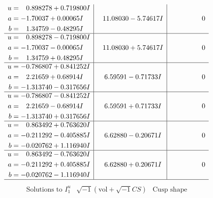 \documentclass[1p]{elsarticle_modified}
\theoremstyle{definition}
\newcommand{\I}{\sqrt{-1}}
\begin{document}
$$\begin{array}{c|c|c}
\begin{aligned}
u &= \phantom{-}0.898278 + 0.719800 I \\
a &= -1.70037 + 0.00065 I \\
b &= \phantom{-}1.34759 - 0.48295 I\end{aligned}
 & \phantom{-}11.08030 - 5.74617 I & \phantom{-0.000000 } 0 \\ \hline\begin{aligned}
u &= \phantom{-}0.898278 - 0.719800 I \\
a &= -1.70037 - 0.00065 I \\
b &= \phantom{-}1.34759 + 0.48295 I\end{aligned}
 & \phantom{-}11.08030 + 5.74617 I & \phantom{-0.000000 } 0 \\ \hline\begin{aligned}
u &= -0.786807 + 0.841252 I \\
a &= \phantom{-}2.21659 + 0.68914 I \\
b &= -1.313740 - 0.317656 I\end{aligned}
 & \phantom{-}6.59591 - 0.71733 I & \phantom{-0.000000 } 0 \\ \hline\begin{aligned}
u &= -0.786807 - 0.841252 I \\
a &= \phantom{-}2.21659 - 0.68914 I \\
b &= -1.313740 + 0.317656 I\end{aligned}
 & \phantom{-}6.59591 + 0.71733 I & \phantom{-0.000000 } 0 \\ \hline\begin{aligned}
u &= \phantom{-}0.863492 + 0.763620 I \\
a &= -0.211292 - 0.405885 I \\
b &= -0.020762 + 1.116940 I\end{aligned}
 & \phantom{-}6.62880 - 0.20671 I & \phantom{-0.000000 } 0 \\ \hline\begin{aligned}
u &= \phantom{-}0.863492 - 0.763620 I \\
a &= -0.211292 + 0.405885 I \\
b &= -0.020762 - 1.116940 I\end{aligned}
 & \phantom{-}6.62880 + 0.20671 I & \phantom{-0.000000 } 0\\
 \hline 
 \end{array}$$\newpage$$\begin{array}{c|c|c}  
\text{Solutions to }I^u_{1}& \I (\text{vol} + \sqrt{-1}CS) & \text{Cusp shape}\\
 \hline 
\begin{aligned}

\end{aligned}
\end{array}$$
\end{document}
